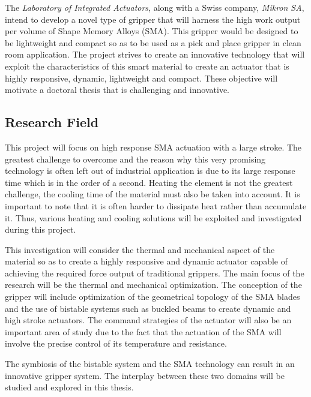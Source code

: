 The \emph{Laboratory of Integrated Actuators}, along with a Swiss company, \emph{Mikron SA}, intend to develop a novel type of gripper that will harness the high work output per volume of Shape Memory Alloys (SMA). This gripper would be designed to be lightweight and compact so as to be used as a pick and place gripper in clean room application. The project strives to create an innovative technology that will exploit the characteristics of this smart material to create an actuator that is highly responsive, dynamic, lightweight and compact. These objective will motivate a doctoral thesis that is challenging and innovative.

\subsection{Research Field}\label{subsec:research_field}
This project will focus on high response SMA actuation with a large stroke. The greatest challenge to overcome and the reason why this very promising technology is often left out of industrial application is due to its large response time which is in the order of a second. Heating the element is not the greatest challenge, the cooling time of the material must also be taken into account. It is important to note that it is often harder to dissipate heat rather than accumulate it. Thus, various heating and cooling solutions will be exploited and investigated during this project.

This investigation will consider the thermal and mechanical aspect of the material so as to create a highly responsive and dynamic actuator capable of achieving the required force output of traditional grippers. The main focus of the research will be the thermal and mechanical optimization. The conception of the gripper will include optimization of the geometrical topology of the SMA blades and the use of bistable systems such as buckled beams to create dynamic and high stroke actuators. The command strategies of the actuator will also be an important area of study due to the fact that the actuation of the SMA will involve the precise control of its temperature and resistance.

The symbiosis of the bistable system and the SMA technology can result in an innovative gripper system. The interplay between these two domains will be studied and explored in this thesis.

